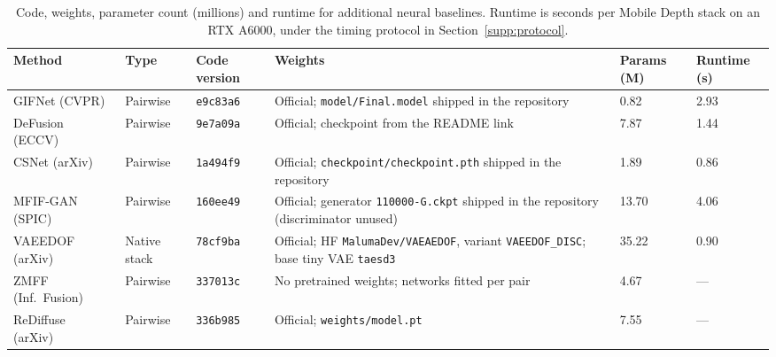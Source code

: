 \begin{table}[htbp]
\caption{Code, weights, parameter count (millions) and runtime for additional neural baselines. Runtime is seconds per Mobile Depth stack on an RTX A6000, under the timing protocol in Section~\ref{supp:protocol}.}
\label{tab:deploy}
\footnotesize
\begin{tabular}{@{}p{1.9cm}p{1.3cm}p{1.4cm}p{3.5cm}p{1.3cm}p{1.5cm}@{}}
\toprule
Method & Type & Code version & Weights & Params (M) & Runtime (s) \\
\midrule
GIFNet (CVPR)~\cite{cheng2025gifnet} & Pairwise & \texttt{e9c83a6} & Official; \texttt{model/Final.model} shipped in the repository & 0.82 & 2.93 \\
DeFusion (ECCV)~\cite{liang2022defusion} & Pairwise & \texttt{9e7a09a} & Official; checkpoint from the README link & 7.87 & 1.44 \\
CSNet (arXiv)~\cite{csnet2026} & Pairwise & \texttt{1a494f9} & Official; \texttt{checkpoint/\allowbreak checkpoint.pth} shipped in the repository & 1.89 & 0.86 \\
MFIF-GAN (SPIC)~\cite{wang2021mfifgan} & Pairwise & \texttt{160ee49} & Official; generator \texttt{110000-G.ckpt} shipped in the repository (discriminator unused) & 13.70 & 4.06 \\
VAEEDOF (arXiv)~\cite{vaeedof2025} & Native stack & \texttt{78cf9ba} & Official; HF \texttt{MalumaDev/VAEAEDOF}, variant \texttt{VAEEDOF\_DISC}; base tiny VAE \texttt{taesd3} & 35.22 & 0.90 \\
ZMFF (Inf.\ Fusion)~\cite{hu2023zmff} & Pairwise & \texttt{337013c} & No pretrained weights; networks fitted per pair & 4.67 & --- \\
ReDiffuse (arXiv)~\cite{rediffuse2026} & Pairwise & \texttt{336b985} & Official; \texttt{weights/model.pt} & 7.55 & --- \\
\bottomrule
\end{tabular}
\end{table}
